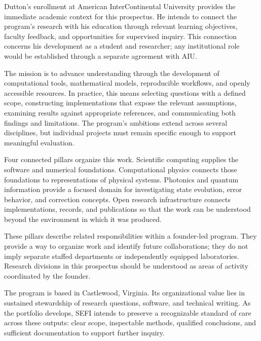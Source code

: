 \documentclass[10pt,letterpaper]{article}
\begin{document}
Dutton's enrollment at American InterContinental University provides the immediate academic context for this prospectus. He intends to connect the program's research with his education through relevant learning objectives, faculty feedback, and opportunities for supervised inquiry. This connection concerns his development as a student and researcher; any institutional role would be established through a separate agreement with AIU.

The mission is to advance understanding through the development of computational tools, mathematical models, reproducible workflows, and openly accessible resources. In practice, this means selecting questions with a defined scope, constructing implementations that expose the relevant assumptions, examining results against appropriate references, and communicating both findings and limitations. The program's ambitions extend across several disciplines, but individual projects must remain specific enough to support meaningful evaluation.

Four connected pillars organize this work. Scientific computing supplies the software and numerical foundations. Computational physics connects those foundations to representations of physical systems. Photonics and quantum information provide a focused domain for investigating state evolution, error behavior, and correction concepts. Open research infrastructure connects implementations, records, and publications so that the work can be understood beyond the environment in which it was produced.

These pillars describe related responsibilities within a founder-led program. They provide a way to organize work and identify future collaborations; they do not imply separate staffed departments or independently equipped laboratories. Research divisions in this prospectus should be understood as areas of activity coordinated by the founder.

The program is based in Castlewood, Virginia. Its organizational value lies in sustained stewardship of research questions, software, and technical writing. As the portfolio develops, SEFI intends to preserve a recognizable standard of care across these outputs: clear scope, inspectable methods, qualified conclusions, and sufficient documentation to support further inquiry.
\end{document}
